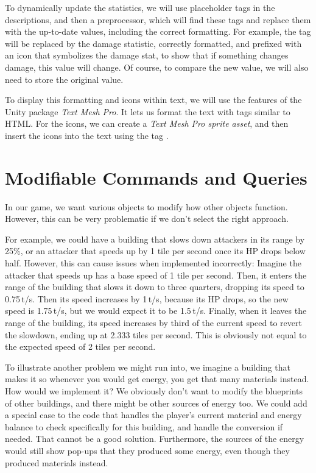 To dynamically update the statistics, we will use placeholder tags in the descriptions, and then a preprocessor, which will find these tags and replace them with the up-to-date values, including the correct formatting.
For example, the tag \mono{[DMG]} will be replaced by the damage statistic, correctly formatted, and prefixed with an icon that symbolizes the damage stat, to show that if something changes damage, this value will change.
Of course, to compare the new value, we will also need to store the original value.

To display this formatting and icons within text, we will use the features of the Unity package \emph{Text Mesh Pro}.
It lets us format the text with tags similar to HTML.
For the icons, we can create a \emph{Text Mesh Pro sprite asset}, and then insert the icons into the text using the tag .

\section{Modifiable Commands and Queries}

In our game, we want various objects to modify how other objects function.
However, this can be very problematic if we don't select the right approach.

For example, we could have a building that slows down attackers in its range by 25\%, or an attacker that speeds up by 1 tile per second once its HP drops below half.
However, this can cause issues when implemented incorrectly:
Imagine the attacker that speeds up has a base speed of 1 tile per second.
Then, it enters the range of the building that slows it down to three quarters, dropping its speed to 0.75\,t/s.
Then its speed increases by 1\,t/s, because its HP drops, so the new speed is 1.75\,t/s, but we would expect it to be 1.5\,t/s.
Finally, when it leaves the range of the building, its speed increases by third of the current speed to revert the slowdown, ending up at 2.333 tiles per second.
This is obviously not equal to the expected speed of 2 tiles per second.

To illustrate another problem we might run into, we imagine a building that makes it so whenever you would get energy, you get that many materials instead.
How would we implement it?
We obviously don't want to modify the blueprints of other buildings, and there might be other sources of energy too.
We could add a special case to the code that handles the player's current material and energy balance to check specifically for this building, and handle the conversion if needed.
That cannot be a good solution.
Furthermore, the sources of the energy would still show pop-ups that they produced some energy, even though they produced materials instead.

